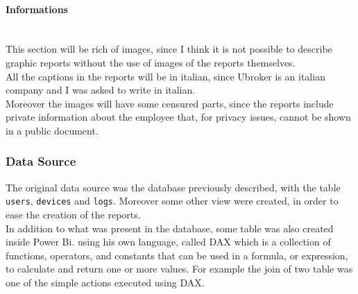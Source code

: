 \documentclass[12pt, a4paper, oneside]{article}
\begin{document}
\paragraph{Informations} ~\\
This section will be rich of images, since I think it is not possible to describe graphic reports without the use of images of the reports themselves. \\
All the captions in the reports will be in italian, since Ubroker is an italian company and I was asked to write in italian.\\
Moreover the images will have some censured parts, since the reports include private information about the employee that, for privacy issues, cannot be shown in a public document.

\subsubsection{Data Source}
The original data source was the database previously described, with the table \texttt{users}, \texttt{devices} and \texttt{logs}. Moreover some other view were created, in order to ease the creation of the
reports.\\
In addition to what was present in the database, some table was also created inside Power Bi. using his own language, called DAX which is a collection of functions, operators, and constants that can be used 
in a formula, or expression, to calculate and return one or more values. For example the join of two table was one of the simple actions executed using DAX.

\newpage
\end{document}
